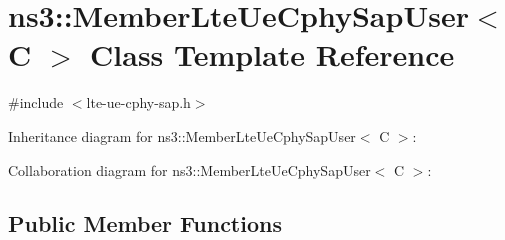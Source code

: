 \hypertarget{classns3_1_1MemberLteUeCphySapUser}{}\section{ns3\+:\+:Member\+Lte\+Ue\+Cphy\+Sap\+User$<$ C $>$ Class Template Reference}
\label{classns3_1_1MemberLteUeCphySapUser}


{\ttfamily \#include $<$lte-\/ue-\/cphy-\/sap.\+h$>$}



Inheritance diagram for ns3\+:\+:Member\+Lte\+Ue\+Cphy\+Sap\+User$<$ C $>$\+:


Collaboration diagram for ns3\+:\+:Member\+Lte\+Ue\+Cphy\+Sap\+User$<$ C $>$\+:
\subsection*{Public Member Functions}
